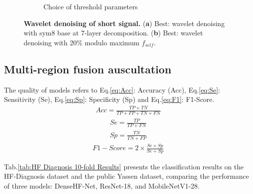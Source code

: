 \begin{figure}
\begin{subfigure}{1\linewidth}
		\caption{Choice of threshold parameters}
		\label{FIG:wavelet.b}%
	\end{subfigure}
\caption{\textbf{Wavelet denoising of short signal.} (\textbf{a}) Best: wavelet denoising with sym8 base at 7-layer decomposition. (\textbf{b}) Best: wavelet denoising with 20\% modulo maximum $f_{self}$.}
\label{FIG:wavelet}
\end{figure}
\subsection{Multi-region fusion auscultation}
The quality of models refers to Eq.\ref{eq:Acc}: Accuracy (Acc), Eq.\ref{eq:Se}: Sensitivity (Se),  Eq.\ref{eq:Sp}: Specificity (Sp) and Eq.\ref{eq:F1}: F1-Score.
\begin{equation}
\begin{split}
    Acc= \frac{TP+TN}{TP+FP+TN+FN}
\end{split}
\label{eq:Acc}
\end{equation}
\begin{equation}
\begin{split}
	Se=   \frac{TP}{TP+FN}
\end{split}
\label{eq:Se}
\end{equation}
\begin{equation}
\begin{split}
  Sp=  \frac{TN}{TN+FP}
\end{split}
\label{eq:Sp}
\end{equation}
\begin{equation}
\begin{split}
  F1-Score= 2\times\frac{Se\times Sp}{Se+Sp} 
\end{split}
\label{eq:F1}
\end{equation}\par

Tab.\ref{tab:HF Diagnosis 10-fold Results} presents the classification results on the HF-Diagnosis dataset and the public Yassen dataset, comparing the performance of three models: DenseHF-Net, ResNet-18, and MobileNetV1-28. 

